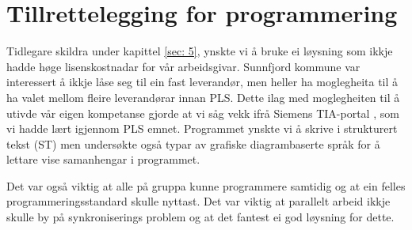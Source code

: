 \chapter{Tillrettelegging for programmering}
\thispagestyle{fancy}
\label{sec:7} 

Tidlegare skildra under kapittel \ref{sec: 5}, ynskte vi å bruke ei løysning som ikkje hadde høge lisenskostnadar for vår arbeidsgivar. 
Sunnfjord kommune var interessert å ikkje låse seg til ein fast leverandør, men heller ha moglegheita til å ha valet mellom fleire 
leverandørar innan \gls{PLS}. Dette ilag med moglegheiten til å utivde vår eigen kompetanse 
gjorde at vi såg vekk ifrå Siemens \gls{TIA}-portal \citep{Siemens}, som vi hadde lært igjennom \gls{PLS} emnet.
Programmet ynskte vi å skrive i strukturert tekst (\gls{ST}) men undersøkte også 
typar av grafiske diagrambaserte språk for å lettare vise samanhengar i programmet.

Det var også viktig at alle på gruppa kunne programmere samtidig og at ein felles programmeringsstandard skulle nyttast.
Det var viktig at parallelt arbeid ikkje skulle by på synkroniserings problem og at det fantest ei god løysning for dette.

